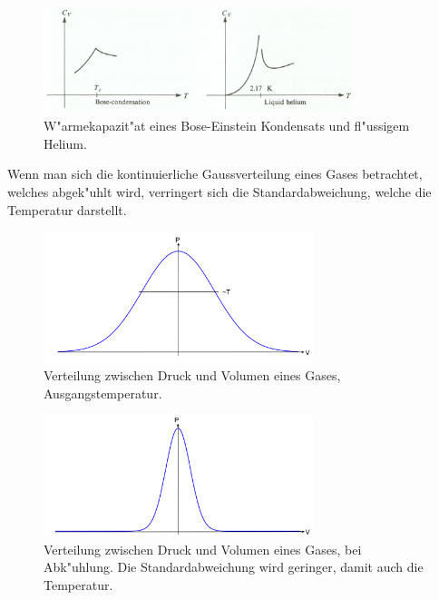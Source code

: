 \begin{refsection}
\begin{figure}
    \centering
    \includegraphics[width = 0.8\textwidth]{./bose/wrmkap.png}
    \caption[W"armekapazit"at eines Bose-Einstein Kondensats und fl"ussigem Helium.]{W"armekapazit"at eines Bose-Einstein Kondensats und fl"ussigem Helium. \cite{bose:feynman}}
    \label{fig:WrmKap}
\end{figure}
Wenn man sich die kontinuierliche Gaussverteilung eines Gases betrachtet, welches abgek"uhlt wird, verringert sich die Standardabweichung, welche die Temperatur darstellt.

\begin{figure}
    \centering
    \includegraphics[width = 0.7\textwidth]{./bose/gauss1.png}
    \caption[Verteilung Ausgangstemperatur]{Verteilung zwischen Druck und Volumen eines Gases, Ausgangstemperatur.}
    \label{fig:Gauss1}
\end{figure}

\begin{figure}
    \centering
    \includegraphics[width = 0.7\textwidth]{./bose/gauss2.png}
    \caption[Verteilung bei Abk"uhlung]{Verteilung zwischen Druck und Volumen eines Gases, bei Abk"uhlung. Die Standardabweichung wird geringer, damit auch die Temperatur.}
	\label{fig:Gauss2}
\end{figure}


\end{refsection}

